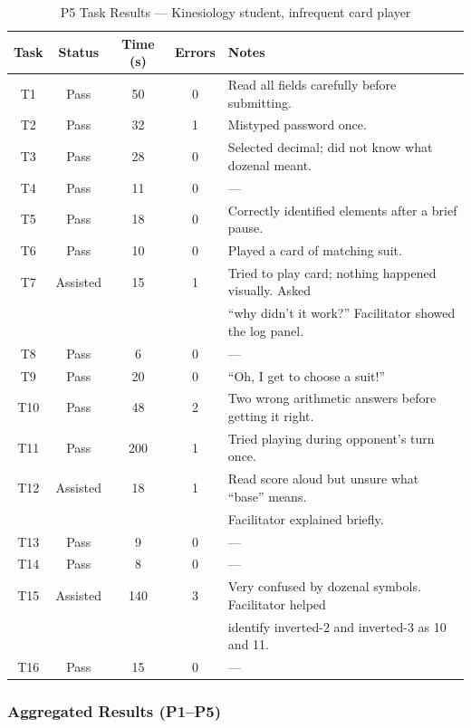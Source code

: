 \documentclass[12pt, titlepage]{article}
\begin{document}
\begin{table}[H]
\centering
\caption{P5 Task Results --- Kinesiology student, infrequent card player}
\label{tab:p5-raw}
\begin{tabular}{c c c c l}
\toprule
\textbf{Task} & \textbf{Status} & \textbf{Time (s)} & \textbf{Errors} & \textbf{Notes} \\
\midrule
T1  & Pass     & 50  & 0 & Read all fields carefully before submitting. \\
T2  & Pass     & 32  & 1 & Mistyped password once. \\
T3  & Pass     & 28  & 0 & Selected decimal; did not know what dozenal meant. \\
T4  & Pass     & 11  & 0 & --- \\
T5  & Pass     & 18  & 0 & Correctly identified elements after a brief pause. \\
T6  & Pass     & 10  & 0 & Played a card of matching suit. \\
T7  & Assisted & 15  & 1 & Tried to play card; nothing happened visually. Asked \\
     &          &     &   & ``why didn't it work?'' Facilitator showed the log panel. \\
T8  & Pass     & 6   & 0 & --- \\
T9  & Pass     & 20  & 0 & ``Oh, I get to choose a suit!'' \\
T10 & Pass     & 48  & 2 & Two wrong arithmetic answers before getting it right. \\
T11 & Pass     & 200 & 1 & Tried playing during opponent's turn once. \\
T12 & Assisted & 18  & 1 & Read score aloud but unsure what ``base'' means. \\
     &          &     &   & Facilitator explained briefly. \\
T13 & Pass     & 9   & 0 & --- \\
T14 & Pass     & 8   & 0 & --- \\
T15 & Assisted & 140 & 3 & Very confused by dozenal symbols. Facilitator helped \\
     &          &     &   & identify inverted-2 and inverted-3 as 10 and 11. \\
T16 & Pass     & 15  & 0 & --- \\
\bottomrule
\end{tabular}
\end{table}

\subsubsection{Aggregated Results (P1--P5)}
\end{document}
